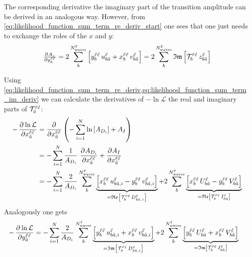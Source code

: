 The corresponding derivative \wrt the imaginary part of the transition
amplitude can be derived in an analogous way.  However, from
\cref{eq:likelihood_function_sum_term_re_deriv_start} one sees that
one just needs to exchange the roles of the $x$ and $y$:
\begin{equation}
  \label{eq:likelihood_function_sum_term_im_deriv}
  \pd{A_z}{{y_{\tilde{a}}^{\tilde{r} \tilde{\refl}}}}
  = 2 \sum_b^{N^{\tilde{\refl}}_\text{waves}} \sBrk{y_b^{\tilde{r} \tilde{\refl}}\, u^{\tilde{\refl}}_{b \tilde{a}}
    + x_b^{\tilde{r} \tilde{\refl}}\, v^{\tilde{\refl}}_{b \tilde{a}}}
  = 2 \sum_b^{N^{\tilde{\refl}}_\text{waves}} \Im\sBrk{\mathcal{T}_b^{\tilde{r} \tilde{\refl}}\, z^{\tilde{\refl}}_{b \tilde{a}}}
\end{equation}

Using
\cref{eq:likelihood_function_sum_term_re_deriv,eq:likelihood_function_sum_term_im_deriv}
we can calculate the derivatives of $-\ln \mathcal{L}$ \wrt the real
and imaginary parts of
$\mathcal{T}_{\tilde{a}}^{\tilde{r} \tilde{\varepsilon}}$:
\begin{align}
  -\dpd{\ln \mathcal{L}}{{x_{\tilde{a}}^{\tilde{r} \tilde{\refl}}}}
  &= \dpd{}{{x_{\tilde{a}}^{\tilde{r} \tilde{\refl}}}} \rBrk{-\sum_{i = 1}^{N} \ln \sBrk{A_{D_i}} + A_I} \\
  &= -\sum_{i = 1}^{N} \frac{1}{A_{D_i}}\, \dpd{A_{D_i}}{{x_{\tilde{a}}^{\tilde{r} \tilde{\refl}}}}
  + \dpd{A_I}{{x_{\tilde{a}}^{\tilde{r} \tilde{\refl}}}} \\
  \label{eq:likelihood_function_re_deriv}
  &= -\sum_{i = 1}^{N} \frac{2}{A_{D_i}} \sum_b^{N^{\tilde{\refl}}_\text{waves}} \underbrace{\sBrk{x_b^{\tilde{r} \tilde{\refl}}\, u^{\tilde{\refl}}_{b \tilde{a}, i}
    - y_b^{\tilde{r} \tilde{\refl}}\, v^{\tilde{\refl}}_{b \tilde{a}, i}}}_{= \Re\sBrk{\mathcal{T}_b^{\tilde{r} \tilde{\refl}}\, D^{\tilde{\refl}}_{b \tilde{a}, i}}}
    + 2 \sum_b^{N^{\tilde{\refl}}_\text{waves}} \underbrace{\sBrk{x_b^{\tilde{r} \tilde{\refl}}\, U^{\tilde{\refl}}_{b \tilde{a}}
    - y_b^{\tilde{r} \tilde{\refl}}\, V^{\tilde{\refl}}_{b \tilde{a}}}}_{= \Re\sBrk{\mathcal{T}_b^{\tilde{r} \tilde{\refl}}\, I^{\tilde{\refl}}_{b \tilde{a}}}}
\end{align}
Analogously one gets
\begin{align}
  \label{eq:likelihood_function_im_deriv}
  -\dpd{\ln \mathcal{L}}{{y_{\tilde{a}}^{\tilde{r} \tilde{\refl}}}}
  &= -\sum_{i = 1}^{N} \frac{2}{A_{D_i}} \sum_b^{N^{\tilde{\refl}}_\text{waves}} \underbrace{\sBrk{y_b^{\tilde{r} \tilde{\refl}}\, u^{\tilde{\refl}}_{b \tilde{a}, i}
    + x_b^{\tilde{r} \tilde{\refl}}\, v^{\tilde{\refl}}_{b \tilde{a}, i}}}_{= \Im\sBrk{\mathcal{T}_b^{\tilde{r} \tilde{\refl}}\, D^{\tilde{\refl}}_{b \tilde{a}, i}}}
    + 2 \sum_b^{N^{\tilde{\refl}}_\text{waves}} \underbrace{\sBrk{y_b^{\tilde{r} \tilde{\refl}}\, U^{\tilde{\refl}}_{b \tilde{a}}
    + x_b^{\tilde{r} \tilde{\refl}}\, V^{\tilde{\refl}}_{b \tilde{a}}}}_{= \Im\sBrk{\mathcal{T}_b^{\tilde{r} \tilde{\refl}}\, I^{\tilde{\refl}}_{b \tilde{a}}}}
\end{align}
